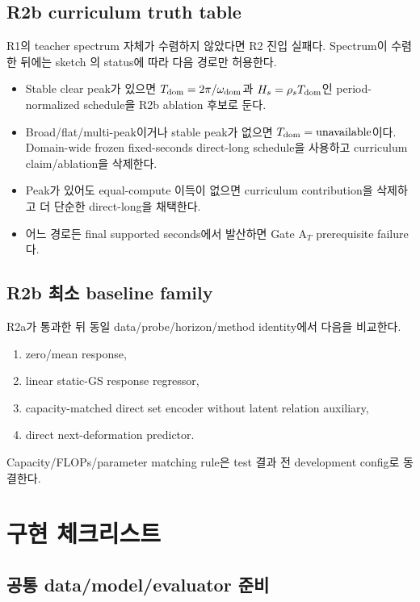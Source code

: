 \documentclass[10pt]{article}
\begin{document}
\subsection{R2b curriculum truth table}

R1의 teacher spectrum 자체가 수렴하지 않았다면 R2 진입 실패다. Spectrum이 수렴한 뒤에는
sketch 의 status에 따라 다음 경로만 허용한다.
\begin{itemize}
  \item Stable clear peak가 있으면 \(T_{\rm dom}=2\pi/\omega_{\rm dom}\)과
  \(H_s=\rho_sT_{\rm dom}\)인 period-normalized schedule을 R2b ablation 후보로 둔다.
  \item Broad/flat/multi-peak이거나 stable peak가 없으면 \(T_{\rm dom}=\mathrm{unavailable}\)이다.
  Domain-wide frozen fixed-seconds direct-long schedule을 사용하고 curriculum claim/ablation을 삭제한다.
  \item Peak가 있어도 equal-compute 이득이 없으면 curriculum contribution을 삭제하고 더 단순한 direct-long을 채택한다.
  \item 어느 경로든 final supported seconds에서 발산하면 Gate A\(_T\) prerequisite failure다.
\end{itemize}

\subsection{R2b 최소 baseline family}

R2a가 통과한 뒤 동일 data/probe/horizon/method identity에서 다음을 비교한다.
\begin{enumerate}
  \item zero/mean response,
  \item linear static-GS response regressor,
  \item capacity-matched direct set encoder without latent relation auxiliary,
  \item direct next-deformation predictor.
\end{enumerate}
Capacity/FLOPs/parameter matching rule은 test 결과 전 development config로 동결한다.

\section{구현 체크리스트}
\label{sec:r2-chapter-4}

\subsection{공통 data/model/evaluator 준비}
\end{document}
